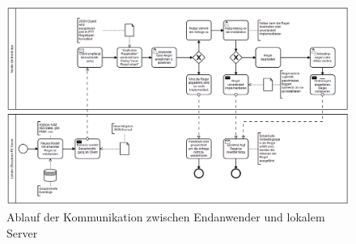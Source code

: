 \begin{figure}[!ht]
    \centering
    \includegraphics[width= 1.52\textwidth, angle=90,origin=c]{figures/Appbildungen/diagramm_app.PNG}
    \caption{Ablauf der Kommunikation zwischen Endanwender und lokalem Server}
    \label{fig:Kommunikationsablauf}
\end{figure}